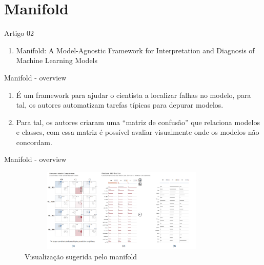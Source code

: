\section{Manifold}

\begin{frame}
	\begin{block}{Artigo 02}
	\begin{enumerate}
		\item Manifold: A Model-Agnostic Framework for Interpretation and Diagnosis of Machine Learning Models
	\end{enumerate}
	\end{block}
\end{frame}


\begin{frame}
	\begin{block}{Manifold - overview}
		\begin{enumerate}
			\item É um framework para ajudar o cientista a localizar falhas no modelo, para tal, os autores automatizam tarefas típicas para depurar modelos.
			\item Para tal, os autores criaram uma ``matriz de confusão'' que relaciona modelos e classes, com essa matriz é possível avaliar visualmente onde os modelos não concordam.
		\end{enumerate}
	\end{block}
\end{frame}


\begin{frame}
	\begin{block}{Manifold - overview}
				\begin{figure}[!htb]
			\centering	  				
			\includegraphics[height=4cm, width = 10cm]{./pic/manifold.png}
			\caption{Visualização sugerida pelo manifold \cite{Manifold}}
			\label{fig_ds_process}
		\end{figure}	
	\end{block}
\end{frame}


